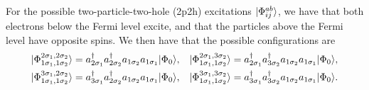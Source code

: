 For the possible two-particle-two-hole (2p2h) excitations $\lvert\Phi_{ij}^{ab}\rangle$, we have that both electrons below the Fermi level excite, and that the particles above the Fermi level have opposite spins.
We then have that the possible configurations are
\begin{align*}
    \lvert\Phi_{1\sigma_1, 1\sigma_2}^{2\sigma_1, 2\sigma_2}\rangle &= a_{2\sigma_1}^\dagger a_{2\sigma_2}^\dagger a_{1\sigma_2} a_{1\sigma_1} \lvert\Phi_0\rangle, &
    \lvert\Phi_{1\sigma_1, 1\sigma_2}^{2\sigma_1, 3\sigma_2}\rangle &= a_{2\sigma_1}^\dagger a_{3\sigma_2}^\dagger a_{1\sigma_2} a_{1\sigma_1} \lvert\Phi_0\rangle, \\
    \lvert\Phi_{1\sigma_1, 1\sigma_2}^{3\sigma_1, 2\sigma_2}\rangle &= a_{3\sigma_1}^\dagger a_{2\sigma_2}^\dagger a_{1\sigma_2} a_{1\sigma_1} \lvert\Phi_0\rangle, &
    \lvert\Phi_{1\sigma_1, 1\sigma_2}^{3\sigma_1, 3\sigma_2}\rangle &= a_{3\sigma_1}^\dagger a_{3\sigma_2}^\dagger a_{1\sigma_2} a_{1\sigma_1} \lvert\Phi_0\rangle.
\end{align*}

